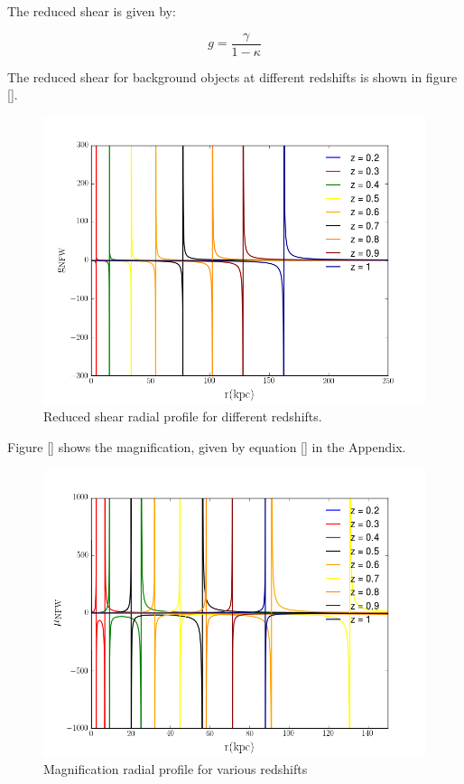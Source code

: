 The reduced shear is given by:

\begin{equation}
g=\frac{\gamma}{1-\kappa}
\end{equation}

The reduced shear for background objects at different redshifts is shown in figure []. 

\begin{figure}[H]
\centering
\includegraphics[width=12cm]{images/Reduced_Shear.png}
\caption[Reduced shear radial]{Reduced shear radial profile for different redshifts.}
\end{figure}

Figure [] shows the magnification, given by equation [] in the Appendix.

\begin{figure}[H]
\centering
\includegraphics[width=12cm]{images/Magnification.png}
\caption[Magnification radial profile]{Magnification radial profile for various redshifts}
\end{figure}





